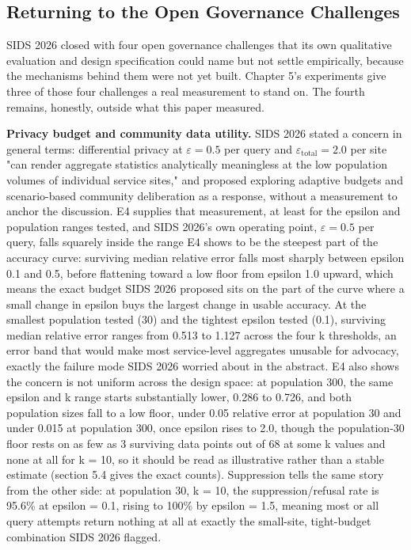 \subsection{Returning to the Open Governance Challenges}

SIDS 2026 closed with four open governance challenges that its own qualitative evaluation and design specification could name but not settle empirically, because the mechanisms behind them were not yet built. Chapter 5's experiments give three of those four challenges a real measurement to stand on. The fourth remains, honestly, outside what this paper measured.

\textbf{Privacy budget and community data utility.} SIDS 2026 stated a concern in general terms: differential privacy at $\varepsilon = 0.5$ per query and $\varepsilon_{\text{total}} = 2.0$ per site "can render aggregate statistics analytically meaningless at the low population volumes of individual service sites," and proposed exploring adaptive budgets and scenario-based community deliberation as a response, without a measurement to anchor the discussion. E4 supplies that measurement, at least for the epsilon and population ranges tested, and SIDS 2026's own operating point, $\varepsilon = 0.5$ per query, falls squarely inside the range E4 shows to be the steepest part of the accuracy curve: surviving median relative error falls most sharply between epsilon 0.1 and 0.5, before flattening toward a low floor from epsilon 1.0 upward, which means the exact budget SIDS 2026 proposed sits on the part of the curve where a small change in epsilon buys the largest change in usable accuracy. At the smallest population tested (30) and the tightest epsilon tested (0.1), surviving median relative error ranges from 0.513 to 1.127 across the four k thresholds, an error band that would make most service-level aggregates unusable for advocacy, exactly the failure mode SIDS 2026 worried about in the abstract. E4 also shows the concern is not uniform across the design space: at population 300, the same epsilon and k range starts substantially lower, 0.286 to 0.726, and both population sizes fall to a low floor, under 0.05 relative error at population 30 and under 0.015 at population 300, once epsilon rises to 2.0, though the population-30 floor rests on as few as 3 surviving data points out of 68 at some k values and none at all for k = 10, so it should be read as illustrative rather than a stable estimate (section 5.4 gives the exact counts). Suppression tells the same story from the other side: at population 30, k = 10, the suppression/refusal rate is 95.6\% at epsilon = 0.1, rising to 100\% by epsilon = 1.5, meaning most or all query attempts return nothing at all at exactly the small-site, tight-budget combination SIDS 2026 flagged.

